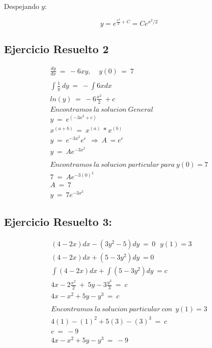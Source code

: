 Despejando \( y \):

\begin{equation}
y = e^{\frac{x^2}{2} + C} = Ce^{x^2/2}
\end{equation}


\subsection{Ejercicio Resuelto 2}

\begin{gather*}
\frac{dy}{dx} \ =\ -6xy,\ \ \ \ \ y( 0) \ =\ 7\\
\\
\int \frac{1}{y} \ dy\ =\ -\int 6xdx\\
ln( y) \ =\ -6\frac{x^{2}}{2} \ +c\\
Encontramos\ la\ solucion\ General\\
y\ =\ e^{\left( -3x^{2} +c\right)}\\
x^{( a+b) \ } =\ x^{( a) \ } *x^{( b) \ }\\
y\ =\ e^{-3x^{2}} e^{c} \ \ \Longrightarrow \ A\ =e^{c} \ \\
y\ =\ Ae^{-3x^{2}}\\
\\
Encontramos\ la\ solucion\ particular\ para\ y( 0) =7\\
7\ =\ Ae^{-3( 0)^{2}}\\
A\ =\ 7\\
y\ =\ 7e^{-3x^{2}}
\end{gather*}
\subsection{Ejercicio Resuelto 3:}


\begin{gather*}
( 4-2x) dx-\left( 3y^{2} -5\right) dy\ =\ 0\ \ \ y( 1) =3\\
( 4-2x) dx+\left( 5-3y^{2}\right) dy\ =0\\
\int ( 4-2x) dx+\int \left( 5-3y^{2}\right) dy\ =c\\
4x-2\frac{x^{2}}{2} \ +\ 5y-3\frac{y^{3}}{3} \ =\ c\\
4x-x^{2} +5y-y^{3} \ =\ c\\
\\
Encontramos\ la\ solucion\ particular\ con\ \ y( 1) =3\\
4( 1) -( 1)^{2} +5( 3) -( 3)^{3} \ =\ c\\
c\ =\ -9\\
4x-x^{2} +5y-y^{3} \ =\ -9
\end{gather*}

